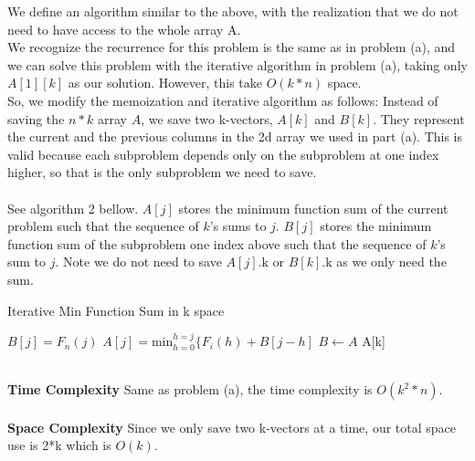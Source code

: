 \documentclass[11pt]{article}
\begin{document}
\begin{solution} We define an algorithm similar to the above, with the realization that we do not need to have access to the whole array A. \\ 

We recognize the recurrence for this problem is the same as in problem (a), and we can solve this problem with the iterative algorithm in problem (a), taking only $A[1][k]$ as our solution. However, this take $O(k*n)$ space. \\

So, we modify the memoization and iterative algorithm as follows: Instead of saving the $n*k$ array $A$, we save two k-vectors, $A[k]$ and $B[k]$. They represent the current and the previous columns in the 2d array we used in part (a). This is valid because each subproblem depends only on the subproblem at one index higher, so that is the only subproblem we need to save. \\ \\ 
See algorithm 2 bellow. $A[j]$ stores the minimum function sum of the current problem such that the sequence of $k$'s sums to $j$. $B[j]$ stores the minimum function sum of the subproblem one index above such that the sequence of $k$'s sum to $j$.  Note we do not need to save $A[j].\text{k}$ or $B[k].\text{k}$ as we only need the sum.
\begin{algorithm}
\caption{Iterative Min Function Sum in k space}
\begin{algorithmic}
\STATE $B[j] = F_n(j)$
\ENDFOR
{}
\STATE $A[j] = \text{min}_{h=0}^{h=j} \{ F_i(h) + B[j-h]$
\ENDFOR
\STATE $B \gets A$
\ENDFOR
\RETURN A[k]
\end{algorithmic}
\end{algorithm} 
\\ 
\textbf{Time Complexity} 
Same as problem (a), the time complexity is $O(k^2*n)$.
\\ \\
\textbf{Space Complexity}
Since we only save two k-vectors at a time, our total space use is 2*k which is $O(k)$.

\end{solution}
\end{document}
